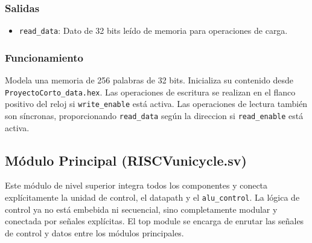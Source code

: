 \documentclass[conference]{IEEEtran}
\begin{document}
\subsubsection{Salidas}
\begin{itemize}
    \item \texttt{read\_data}: Dato de 32 bits leído de memoria para operaciones de carga.
\end{itemize}
\subsubsection{Funcionamiento}
Modela una memoria de 256 palabras de 32 bits. Inicializa su contenido desde \texttt{ProyectoCorto\_data.hex}. Las operaciones de escritura se realizan en el flanco positivo del reloj si \texttt{write\_enable} está activa. Las operaciones de lectura también son síncronas, proporcionando \texttt{read\_data} según la direccion si \texttt{read\_enable} está activa.

\subsection{Módulo Principal (RISCVunicycle.sv)}
Este módulo de nivel superior integra todos los componentes y conecta explícitamente la unidad de control, el datapath y el \texttt{alu\_control}. La lógica de control ya no está embebida ni secuencial, sino completamente modular y conectada por señales explícitas. El top module se encarga de enrutar las señales de control y datos entre los módulos principales.
\end{document}
